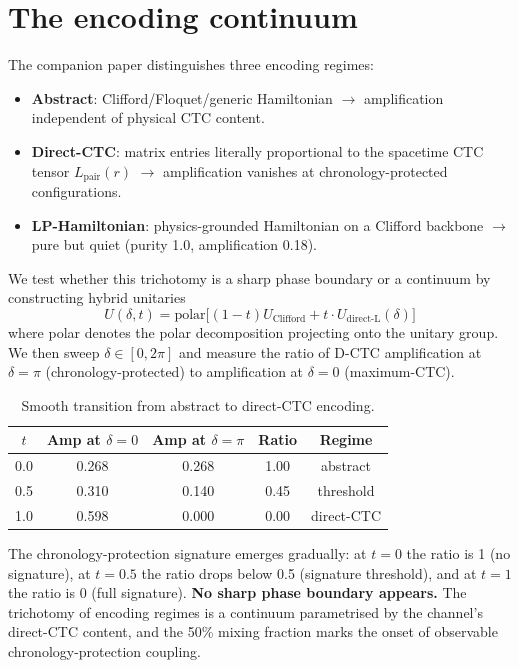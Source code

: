 \documentclass[11pt,a4paper]{article}
\begin{document}
\section{The encoding continuum}

The companion paper \cite{Knopp2026DCTC} distinguishes three
encoding regimes:
\begin{itemize}
\item \textbf{Abstract}: Clifford/Floquet/generic Hamiltonian $\to$
amplification independent of physical CTC content.
\item \textbf{Direct-CTC}: matrix entries literally proportional to
the spacetime CTC tensor $L_{\text{pair}}(r)$ $\to$ amplification
vanishes at chronology-protected configurations.
\item \textbf{LP-Hamiltonian}: physics-grounded Hamiltonian on a
Clifford backbone $\to$ pure but quiet (purity 1.0, amplification 0.18).
\end{itemize}

We test whether this trichotomy is a sharp phase boundary or a
continuum by constructing hybrid unitaries
\begin{equation}
U(\delta, t) = \mathrm{polar}\!\big[ (1-t) U_{\text{Clifford}} + t \cdot U_{\text{direct-L}}(\delta) \big]
\end{equation}
where polar denotes the polar decomposition projecting onto the
unitary group. We then sweep $\delta \in [0, 2\pi]$ and measure the
ratio of D-CTC amplification at $\delta = \pi$ (chronology-protected)
to amplification at $\delta = 0$ (maximum-CTC).

\begin{table}[h]
\centering
\caption{Smooth transition from abstract to direct-CTC encoding.}
\label{tab:smooth-transition}
\begin{tabular}{ccccc}
\toprule
$t$ & Amp at $\delta=0$ & Amp at $\delta=\pi$ & Ratio & Regime \\
\midrule
0.0 & 0.268 & 0.268 & 1.00 & abstract \\
0.5 & 0.310 & 0.140 & 0.45 & threshold \\
1.0 & 0.598 & 0.000 & 0.00 & direct-CTC \\
\bottomrule
\end{tabular}
\end{table}

The chronology-protection signature emerges gradually: at $t = 0$
the ratio is 1 (no signature), at $t = 0.5$ the ratio drops below
0.5 (signature threshold), and at $t = 1$ the ratio is 0 (full
signature). \textbf{No sharp phase boundary appears.} The trichotomy
of encoding regimes is a continuum parametrised by the channel's
direct-CTC content, and the 50\% mixing fraction marks the onset of
observable chronology-protection coupling.
\end{document}
